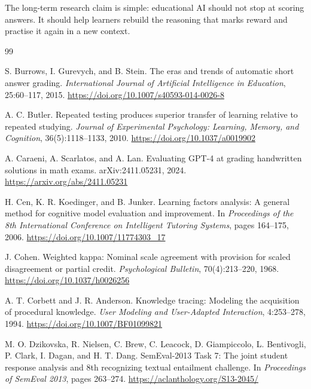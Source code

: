 \documentclass[11pt]{article}
\begin{document}
The long-term research claim is simple: educational AI should not stop at scoring answers. It should help learners rebuild the reasoning that marks reward and practise it again in a new context.

\begin{thebibliography}{99}

S. Burrows, I. Gurevych, and B. Stein.
\newblock The eras and trends of automatic short answer grading.
\newblock \textit{International Journal of Artificial Intelligence in Education}, 25:60--117, 2015.
\newblock \url{https://doi.org/10.1007/s40593-014-0026-8}

A. C. Butler.
\newblock Repeated testing produces superior transfer of learning relative to repeated studying.
\newblock \textit{Journal of Experimental Psychology: Learning, Memory, and Cognition}, 36(5):1118--1133, 2010.
\newblock \url{https://doi.org/10.1037/a0019902}

A. Caraeni, A. Scarlatos, and A. Lan.
\newblock Evaluating GPT-4 at grading handwritten solutions in math exams.
\newblock arXiv:2411.05231, 2024.
\newblock \url{https://arxiv.org/abs/2411.05231}

H. Cen, K. R. Koedinger, and B. Junker.
\newblock Learning factors analysis: A general method for cognitive model evaluation and improvement.
\newblock In \textit{Proceedings of the 8th International Conference on Intelligent Tutoring Systems}, pages 164--175, 2006.
\newblock \url{https://doi.org/10.1007/11774303_17}

J. Cohen.
\newblock Weighted kappa: Nominal scale agreement with provision for scaled disagreement or partial credit.
\newblock \textit{Psychological Bulletin}, 70(4):213--220, 1968.
\newblock \url{https://doi.org/10.1037/h0026256}

A. T. Corbett and J. R. Anderson.
\newblock Knowledge tracing: Modeling the acquisition of procedural knowledge.
\newblock \textit{User Modeling and User-Adapted Interaction}, 4:253--278, 1994.
\newblock \url{https://doi.org/10.1007/BF01099821}

M. O. Dzikovska, R. Nielsen, C. Brew, C. Leacock, D. Giampiccolo, L. Bentivogli, P. Clark, I. Dagan, and H. T. Dang.
\newblock SemEval-2013 Task 7: The joint student response analysis and 8th recognizing textual entailment challenge.
\newblock In \textit{Proceedings of SemEval 2013}, pages 263--274.
\newblock \url{https://aclanthology.org/S13-2045/}


\end{thebibliography}
\end{document}

